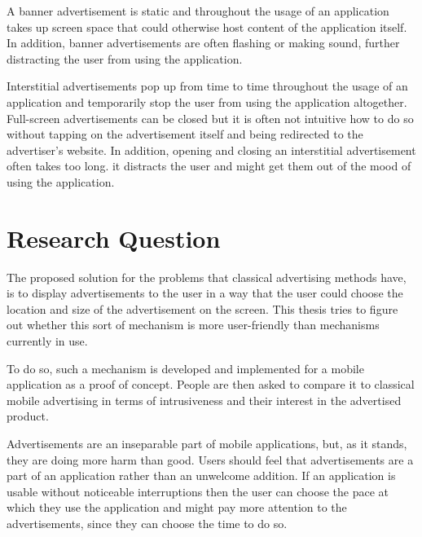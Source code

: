 A banner advertisement is static and throughout the usage of an application takes up screen space that could otherwise host content of the application itself. In addition, banner advertisements are often flashing or making sound, further distracting the user from using the application.

Interstitial advertisements pop up from time to time throughout the usage of an application and temporarily stop the user from using the application altogether. Full-screen advertisements can be closed but it is often not intuitive how to do so without tapping on the advertisement itself and being redirected to the advertiser's website. In addition, opening and closing an interstitial advertisement often takes too long. it distracts the user and might get them out of the mood of using the application.


\section{Research Question}

The proposed solution for the problems that classical advertising methods have, is to display advertisements to the user in a way that the user could choose the location and size of the advertisement on the screen. This thesis tries to figure out whether this sort of mechanism is more user-friendly than mechanisms currently in use.

To do so, such a mechanism is developed and implemented for a mobile application as a proof of concept. People are then asked to compare it to classical mobile advertising in terms of intrusiveness and their interest in the advertised product.

Advertisements are an inseparable part of mobile applications, but, as it stands, they are doing more harm than good. Users should feel that advertisements are a part of an application rather than an unwelcome addition. If an application is usable without noticeable interruptions then the user can choose the pace at which they use the application and might pay more attention to the advertisements, since they can choose the time to do so.

